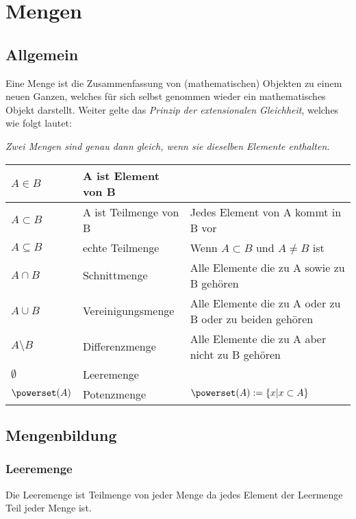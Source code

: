 \documentclass[a4paper,DIV10,12pt,headsepline,smallheadings,halfparskip-]{scrreprt}
\begin{document}
	\chapter{Mengen}
	\section{Allgemein}
	Eine Menge ist die Zusammenfassung von (mathematischen) Objekten zu einem neuen Ganzen, welches für sich selbst genommen wieder ein mathematisches Objekt darstellt. Weiter gelte das \emph{Prinzip der extensionalen Gleichheit}, welches wie folgt lautet:
	\par \hspace*{10mm} \emph{Zwei Mengen sind genau dann gleich, wenn sie dieselben Elemente enthalten.}

	\begin{longtable}{|p{}|p{}|p{}|}
		\hline
		\( A \in B \) & A ist Element von B & \\
		\hline
		\( A \subset B \) & A ist Teilmenge von B & Jedes Element von A kommt in B vor \\
		\hline
		\( A \subseteq B \) & echte Teilmenge & Wenn \(A \subset B \) und \(A \neq B \) ist \\
		\hline
		\( A \cap B \) & Schnittmenge & Alle Elemente die zu A sowie zu B gehören \\
		\hline
		\( A \cup B \) & Vereinigungsmenge & Alle Elemente die zu A oder zu B oder zu beiden gehören \\
		\hline
		\( A \setminus B \) & Differenzmenge & Alle Elemente die zu A aber nicht zu B gehören \\
		\hline
		\( \emptyset \) & Leeremenge & \\
		\hline
		\( \powerset(A) \) & Potenzmenge & \( \powerset(A) := \{x|x \subset A\} \) \\
		\hline
	\end{longtable}

	\section{Mengenbildung}
	\subsection{Leeremenge}
	Die Leeremenge ist Teilmenge von jeder Menge da jedes Element der Leermenge Teil jeder Menge ist.
\end{document}
